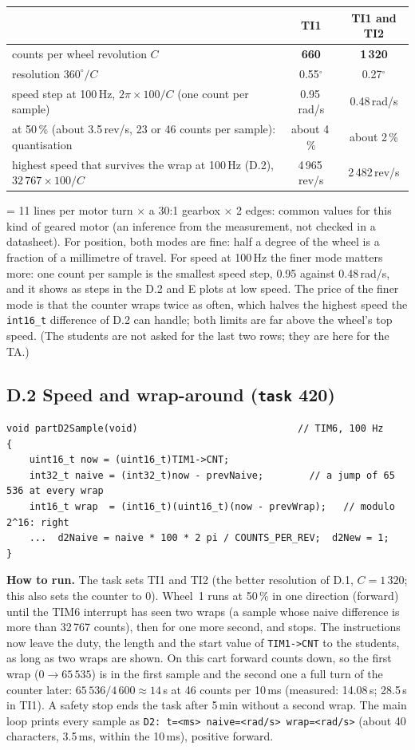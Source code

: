 \documentclass[11pt,a4paper]{article}
\newcommand{\lv}[1]{\texttt{#1}}                 %
\newcommand{\run}[1]{\textbf{How to run.} #1}
\begin{document}
\smallskip\noindent
\begin{tabularx}{\textwidth}{@{}L c c@{}}
\toprule
 & TI1 & TI1 and TI2 \\
\midrule
counts per wheel revolution $C$ & \textbf{660} & \textbf{1\,320} \\
resolution $360^\circ / C$ & 0.55$^\circ$ & 0.27$^\circ$ \\
speed step at 100\,Hz, $2\pi \times 100 / C$ (one count per sample) & 0.95\,rad/s & 0.48\,rad/s \\
at 50\,\% (about 3.5\,rev/s, 23 or 46 counts per sample): quantisation & about 4\,\% & about 2\,\% \\
highest speed that survives the wrap at 100\,Hz (D.2), $32\,767 \times 100 / C$ & 4\,965\,rev/s & 2\,482\,rev/s \\
\bottomrule
\end{tabularx}

\smallskip{} = 11 lines per motor turn $\times$ a 30:1 gearbox $\times$ 2 edges: common values for this kind of geared motor
(an inference from the measurement, not checked in a datasheet). For position, both modes are fine: half a degree of
the wheel is a fraction of a millimetre of travel. For speed at 100\,Hz the finer mode matters more: one count per
sample is the smallest speed step, 0.95 against 0.48\,rad/s, and it shows as steps in the D.2 and E plots at low
speed. The price of the finer mode is that the counter wraps twice as often, which halves the highest speed the
\texttt{int16\_t} difference of D.2 can handle; both limits are far above the wheel's top speed. (The students are not
asked for the last two rows; they are here for the TA.)

\subsection*{D.2 Speed and wrap-around (\lv{task} 420)}
\begin{lstlisting}
void partD2Sample(void)                            // TIM6, 100 Hz
{
    uint16_t now = (uint16_t)TIM1->CNT;
    int32_t naive = (int32_t)now - prevNaive;        // a jump of 65 536 at every wrap
    int16_t wrap  = (int16_t)(uint16_t)(now - prevWrap);   // modulo 2^16: right
    ...  d2Naive = naive * 100 * 2 pi / COUNTS_PER_REV;  d2New = 1;
}
\end{lstlisting}
\run{The task sets TI1 and TI2 (the better resolution of D.1, $C = 1\,320$; this also sets the counter to 0). Wheel~1
runs at 50\,\% in one direction (forward) until the TIM6 interrupt has seen two wraps (a sample whose naive
difference is more than 32\,767 counts), then for one more second, and stops. The instructions now leave the duty, the
length and the start value of \texttt{TIM1->CNT} to the students, as long as two wraps are shown. On this cart forward
counts down, so the first wrap ($0 \to 65\,535$) is in the first sample and the second one a full turn of the counter
later: $65\,536 / 4\,600 \approx 14$\,s at 46 counts per 10\,ms (measured: 14.08\,s; 28.5\,s in TI1). A safety stop ends the task
after 5\,min without a second wrap. The main loop prints every sample as
\texttt{D2: t=<ms> naive=<rad/s> wrap=<rad/s>} (about 40 characters, 3.5\,ms, within the 10\,ms), positive forward.}
\end{document}
